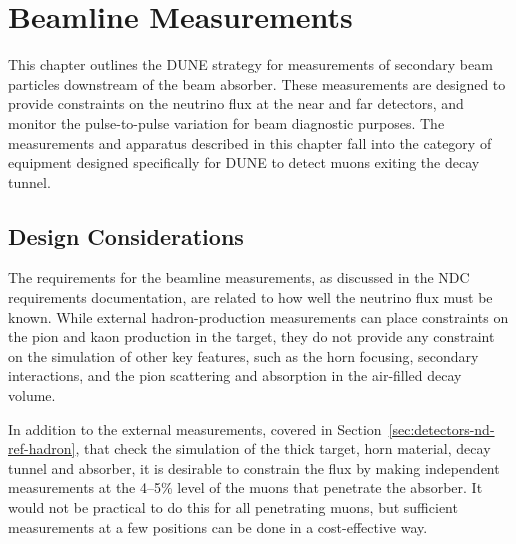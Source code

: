 \section{Beamline Measurements} 
\label{sec:detectors-nd-ref-blm}

This chapter outlines the DUNE strategy for measurements of secondary
beam particles downstream of  the beam absorber. 
These measurements are designed to provide constraints 
on the neutrino flux at the near and far
detectors, and monitor the pulse-to-pulse variation
 for beam diagnostic purposes. 
The measurements and apparatus described in this chapter fall into
the category of equipment designed specifically for DUNE to
detect muons exiting the decay tunnel. 

\subsection{Design Considerations}
\label{subsec:detectors-nd-blm-design}

\begin{sloppypar}
The requirements for the beamline measurements,
as discussed in the NDC requirements documentation\cite{lbnfdune-cdr-req}, 
are related to how well the neutrino flux must be known.
While external hadron-production measurements can place 
constraints on the pion and kaon production in the target, they do not 
provide any constraint on the simulation of other key features, such 
as the horn focusing, secondary interactions, and the 
pion scattering and absorption in the air-filled decay volume. 

In addition to the external measurements, covered in
Section~\ref{sec:detectors-nd-ref-hadron}, that check the
simulation of the thick target, horn material, decay tunnel and
absorber, it is desirable to constrain the flux by making independent
measurements at the 4--5\% level of the muons that penetrate the
absorber. It would not be practical to do this for all penetrating
muons, but sufficient measurements at a few positions can be done in a
cost-effective way.
\end{sloppypar}
%


